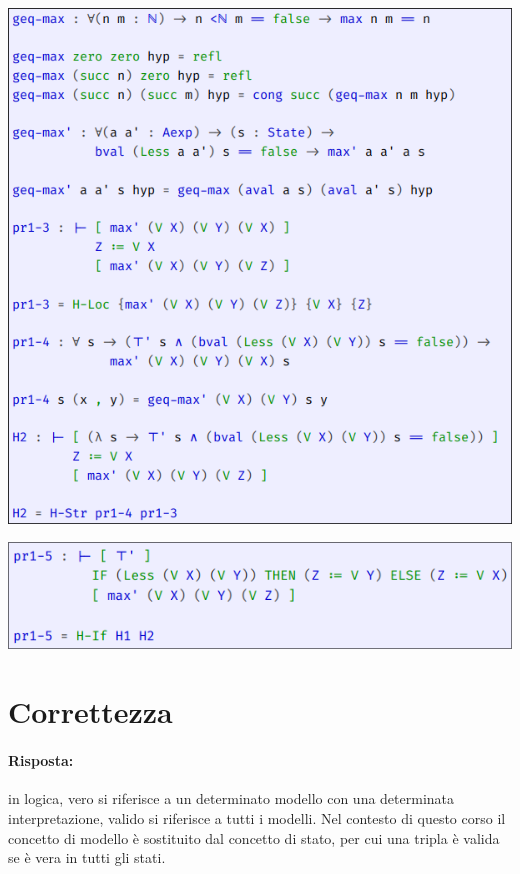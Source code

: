 \begin{center}
  \includegraphics[scale = 0.5]{images/IMP/H2}
\end{center}



\begin{center}
  \includegraphics[scale = 0.5]{images/IMP/pr1-5}
\end{center}

\section{Correttezza}


\paragraph{Risposta:} in logica, vero si riferisce a un determinato modello con una determinata interpretazione, valido si riferisce a tutti i modelli. Nel contesto di questo corso il concetto di modello è sostituito dal concetto di stato, per cui una tripla è valida se è vera in tutti gli stati.

